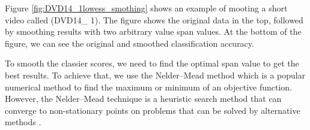 %
%
%
%
%


Figure \ref{fig:DVD14_1lowess_smothing} shows an example of mooting a short video called (DVD14\_ 1). The figure shows the original data in the top, followed by smoothing results with two arbitrary value span values. At the bottom of the figure, we can see the original and smoothed classification accuracy.


To smooth the classier scores, we need to find the optimal span value to get the best results. To achieve that, we use the Nelder–Mead method which is a popular numerical method to find the maximum or minimum of an objective function. However, the Nelder–Mead technique is a heuristic search method that can converge to non-stationary points on problems that can be solved by alternative methods \citep{barati2011parameter}.

